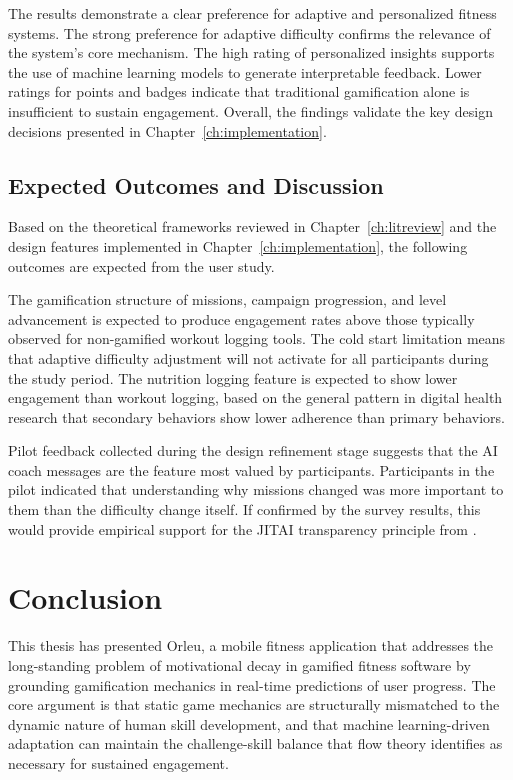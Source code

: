 \documentclass[12pt, a4paper]{report}
\begin{document}
The results demonstrate a clear preference for adaptive and personalized fitness systems. The strong preference for adaptive difficulty confirms the relevance of the system's core mechanism. The high rating of personalized insights supports the use of machine learning models to generate interpretable feedback. Lower ratings for points and badges indicate that traditional gamification alone is insufficient to sustain engagement. Overall, the findings validate the key design decisions presented in Chapter~\ref{ch:implementation}.

\section{Expected Outcomes and Discussion}

Based on the theoretical frameworks reviewed in Chapter~\ref{ch:litreview} and the design features implemented in Chapter~\ref{ch:implementation}, the following outcomes are expected from the user study.

The gamification structure of missions, campaign progression, and level advancement is expected to produce engagement rates above those typically observed for non-gamified workout logging tools. The cold start limitation means that adaptive difficulty adjustment will not activate for all participants during the study period. The nutrition logging feature is expected to show lower engagement than workout logging, based on the general pattern in digital health research that secondary behaviors show lower adherence than primary behaviors.

Pilot feedback collected during the design refinement stage suggests that the AI coach messages are the feature most valued by participants. Participants in the pilot indicated that understanding why missions changed was more important to them than the difficulty change itself. If confirmed by the survey results, this would provide empirical support for the JITAI transparency principle from \citet{nahum2018}.

\chapter{Conclusion}
\label{ch:conclusion}

This thesis has presented Orleu, a mobile fitness application that addresses the long-standing problem of motivational decay in gamified fitness software by grounding gamification mechanics in real-time predictions of user progress. The core argument is that static game mechanics are structurally mismatched to the dynamic nature of human skill development, and that machine learning-driven adaptation can maintain the challenge-skill balance that flow theory identifies as necessary for sustained engagement.
\end{document}
